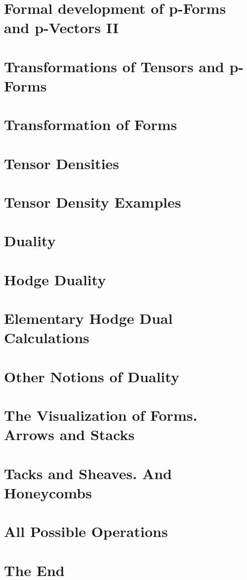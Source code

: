 \documentclass{article}
\begin{document}
\section{Formal development of p-Forms and p-Vectors II}
\section{Transformations of Tensors and p-Forms}
\section{Transformation of Forms}
\section{Tensor Densities}
\section{Tensor Density Examples}
\section{Duality}
\section{Hodge Duality}
\section{Elementary Hodge Dual Calculations}
\section{Other Notions of Duality}
\section{The Visualization of Forms. Arrows and Stacks}
\section{Tacks and Sheaves. And Honeycombs}
\section{All Possible Operations}
\section{The End}
\end{document}
